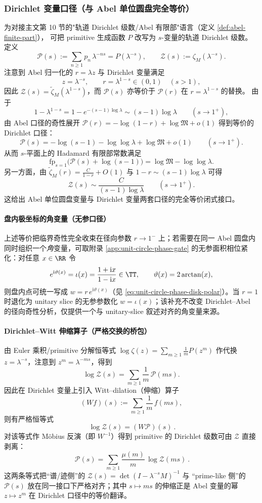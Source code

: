 \subsubsection{Dirichlet 变量口径（与 Abel 单位圆盘完全等价）}\label{app:real-input-40-dirichlet}
为对接主文第 10 节的"轨道 Dirichlet 级数/Abel 有限部"语言（定义 \ref{def:abel-finite-part}），
可把 primitive 生成函数 $P$ 改写为 $s$-变量的轨道 Dirichlet 级数。定义
\[
\mathcal{P}(s):=\sum_{n\ge 1}p_n\,\lambda^{-ns}=P(\lambda^{-s}),
\qquad
\mathcal{Z}(s):=\zeta_M(\lambda^{-s}).
\]
注意到 Abel 归一化的 $r=\lambda z$ 与 Dirichlet 变量满足
\[
z=\lambda^{-s},\qquad r=\lambda^{1-s}\in(0,1)\quad(s>1),
\]
因此 $\mathcal{Z}(s)=\widetilde{\zeta}_M(\lambda^{1-s})$，而 $\mathcal{P}(s)$ 亦等价于 $\mathcal{P}(r)$ 在 $r=\lambda^{1-s}$ 的替换。
由于
\[
1-\lambda^{1-s}=1-e^{-(s-1)\log\lambda}\sim (s-1)\log\lambda\qquad(s\to 1^+),
\]
由 Abel 口径的奇性展开
\(
\mathcal{P}(r)=-\log(1-r)+\log\mathfrak{M}+o(1)
\)
得到等价的 Dirichlet 口径：
\[
\mathcal{P}(s)=-\log(s-1)-\log\log\lambda+\log\mathfrak{M}+o(1)\qquad(s\to 1^+).
\]
从而 $s$-平面上的 Hadamard 有限部常数满足
\[
\mathrm{fp}_{s=1}\bigl(\mathcal{P}(s)+\log(s-1)\bigr)=\log\mathfrak{M}-\log\log\lambda.
\]
另一方面，由 $\widetilde{\zeta}_M(r)=\frac{C}{1-r}+O(1)$ 与 $1-r\sim (s-1)\log\lambda$ 可得
\[
\mathcal{Z}(s)\sim \frac{C}{(s-1)\log\lambda}\qquad(s\to 1^+).
\]
这给出 Abel 单位圆盘变量与 Dirichlet 变量两套口径的完全等价闭式接口。

\paragraph{盘内极坐标的角变量（无参口径）}
上述等价把临界奇性完全收束在径向参数 \(r\to 1^{-}\) 上；若需要在同一 Abel 圆盘内同时组织一个\emph{角}变量，可取附录 \ref{app:unit-circle-phase-gate} 的无参面积相位紧化：对任意 \(x\in\RR\) 令
\[
e^{\mathrm{i}\vartheta(x)}=\iota(x)=\frac{1+\mathrm{i}x}{1-\mathrm{i}x}\in\TT,
\qquad
\vartheta(x)=2\arctan(x),
\]
则盘内点可统一写成 \(w=r\,e^{\mathrm{i}\vartheta(x)}\)（见 \eqref{eq:unit-circle-phase-disk-polar}）。当 \(r=1\) 时退化为 unitary slice 的无参参数化 \(w=\iota(x)\)；该补充不改变 Dirichlet--Abel 的径向奇性分析，仅提供一个与 unitary-slice 叙述对齐的角变量来源。

\paragraph{Dirichlet--Witt 伸缩算子（严格交换的桥包）}
由 Euler 乘积/primitive 分解恒等式
\(
\log\zeta(z)=\sum_{m\ge 1}\frac{1}{m}P(z^m)
\)
作代换 $z=\lambda^{-s}$，注意到 $z^m=\lambda^{-ms}$，得到
\[
\log\mathcal{Z}(s)=\sum_{m\ge 1}\frac{1}{m}\,\mathcal{P}(ms).
\]
因此在 Dirichlet 变量上引入 Witt--dilation（伸缩）算子
\[
(Wf)(s):=\sum_{m\ge 1}\frac{1}{m}\,f(ms),
\]
则有严格恒等式
\[
\boxed{\ \log\mathcal{Z}(s)=(W\mathcal{P})(s)\ }.
\]
对该等式作 Möbius 反演（即 $W^{-1}$）得到 primitive 的 Dirichlet 级数可由 $\mathcal{Z}$ 直接剥离：
\[
\boxed{\ \mathcal{P}(s)=\sum_{m\ge 1}\frac{\mu(m)}{m}\,\log\mathcal{Z}(ms)\ }.
\]
这两条等式把“谱/迹侧”的 $\mathcal{Z}(s)=\det(I-\lambda^{-s}M)^{-1}$ 与 “prime-like 侧”的 $\mathcal{P}(s)$ 放在同一接口下严格对齐；其中 $s\mapsto ms$ 的伸缩正是 Abel 变量的幂 $z\mapsto z^m$ 在 Dirichlet 口径中的等价翻译。

